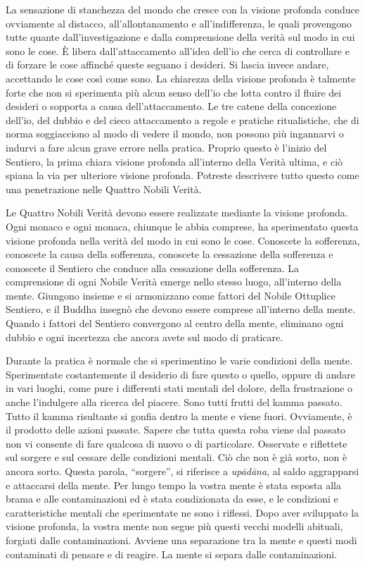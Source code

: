 La sensazione di stanchezza del mondo che cresce con la visione profonda
conduce ovviamente al distacco, all'allontanamento e all'indifferenza,
le quali provengono tutte quante dall'investigazione e dalla
comprensione della verità sul modo in cui sono le cose. È libera
dall'attaccamento all'idea dell'io che cerca di controllare e di forzare
le cose affinché queste seguano i desideri. Si lascia invece andare,
accettando le cose così come sono. La chiarezza della visione profonda è
talmente forte che non si sperimenta più alcun senso dell'io che lotta
contro il fluire dei desideri o sopporta a causa dell'attaccamento. Le
tre catene della concezione dell'io, del dubbio e del cieco attaccamento
a regole e pratiche ritualistiche, che di norma soggiacciono al modo di
vedere il mondo, non possono più ingannarvi o indurvi a fare alcun grave
errore nella pratica. Proprio questo è l'inizio del Sentiero, la prima
chiara visione profonda all'interno della Verità ultima, e ciò spiana la
via per ulteriore visione profonda. Potreste descrivere tutto questo
come una penetrazione nelle Quattro Nobili Verità.

Le Quattro Nobili Verità devono essere realizzate mediante la visione
profonda. Ogni monaco e ogni monaca, chiunque le abbia comprese, ha
sperimentato questa visione profonda nella verità del modo in cui sono
le cose. Conoscete la sofferenza, conoscete la causa della sofferenza,
conoscete la cessazione della sofferenza e conoscete il Sentiero che
conduce alla cessazione della sofferenza. La comprensione di ogni Nobile
Verità emerge nello stesso luogo, all'interno della mente. Giungono
insieme e si armonizzano come fattori del Nobile Ottuplice Sentiero, e
il Buddha insegnò che devono essere comprese all'interno della mente.
Quando i fattori del Sentiero convergono al centro della mente,
eliminano ogni dubbio e ogni incertezza che ancora avete sul modo di
praticare.

Durante la pratica è normale che si sperimentino le varie condizioni
della mente. Sperimentate costantemente il desiderio di fare questo o
quello, oppure di andare in vari luoghi, come pure i differenti stati
mentali del dolore, della frustrazione o anche l'indulgere alla ricerca
del piacere. Sono tutti frutti del kamma passato. Tutto il
kamma risultante si gonfia dentro la mente e viene fuori.
Ovviamente, è il prodotto delle azioni passate. Sapere che tutta questa
roba viene dal passato non vi consente di fare qualcosa di nuovo o di
particolare. Osservate e riflettete sul sorgere e sul cessare delle
condizioni mentali. Ciò che non è già sorto, non è ancora sorto. Questa
parola, ``sorgere'', si riferisce a \emph{upādāna}, al saldo aggrapparsi
e attaccarsi della mente. Per lungo tempo la vostra mente è stata
esposta alla brama e alle contaminazioni ed è stata condizionata da
esse, e le condizioni e caratteristiche mentali che sperimentate ne sono
i riflessi. Dopo aver sviluppato la visione profonda, la vostra mente
non segue più questi vecchi modelli abituali, forgiati dalle
contaminazioni. Avviene una separazione tra la mente e questi modi
contaminati di pensare e di reagire. La mente si separa dalle
contaminazioni.

